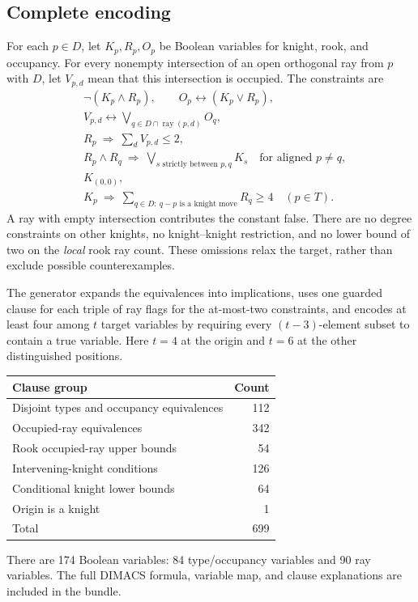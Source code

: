\documentclass[11pt]{article}
\begin{document}
\subsection{Complete encoding}
For each \(p\in D\), let \(K_p,R_p,O_p\) be Boolean variables for knight,
rook, and occupancy. For every nonempty intersection of an open orthogonal
ray from \(p\) with \(D\), let \(V_{p,d}\) mean that this intersection is
occupied. The constraints are
\begin{align*}
&\neg(K_p\wedge R_p),\qquad O_p\leftrightarrow(K_p\vee R_p),\\
&V_{p,d}\leftrightarrow\bigvee_{q\in D\cap\operatorname{ray}(p,d)} O_q,\\
&R_p\ \Longrightarrow\ \sum_d V_{p,d}\leq2,\\
&R_p\wedge R_q\ \Longrightarrow\ \bigvee_{s\text{ strictly between }p,q}K_s
   \quad\text{for aligned }p\ne q,\\
&K_{(0,0)},\\
&K_p\ \Longrightarrow\ \sum_{q\in D:\ q-p\text{ is a knight move}} R_q\geq4
   \quad(p\in T).
\end{align*}
A ray with empty intersection contributes the constant false. There are
no degree constraints on other knights, no knight--knight restriction,
and no lower bound of two on the \emph{local} rook ray count. These omissions
relax the target, rather than exclude possible counterexamples.

The generator expands the equivalences into implications, uses one guarded
clause for each triple of ray flags for the at-most-two constraints, and
encodes at least four among \(t\) target variables by requiring every
\((t-3)\)-element subset to contain a true variable. Here \(t=4\) at the
origin and \(t=6\) at the other distinguished positions.

\begin{center}
\begin{tabular}{lr}
\toprule
Clause group&Count\\\midrule
Disjoint types and occupancy equivalences&112\\
Occupied-ray equivalences&342\\
Rook occupied-ray upper bounds&54\\
Intervening-knight conditions&126\\
Conditional knight lower bounds&64\\
Origin is a knight&1\\\midrule
Total&699\\\bottomrule
\end{tabular}
\end{center}
There are 174 Boolean variables: 84 type/occupancy variables and 90 ray
variables. The full DIMACS formula, variable map, and clause explanations
are included in the bundle.
\end{document}
